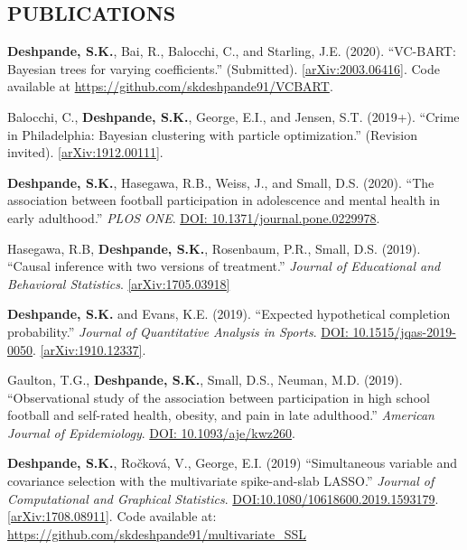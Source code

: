 \documentclass[margin]{res}
\begin{document}
\begin{resume}
\section{PUBLICATIONS}

\textbf{Deshpande, S.K.}, Bai, R., Balocchi, C., and Starling, J.E. (2020). ``VC-BART: Bayesian trees for varying coefficients.'' (Submitted). \href{https://arxiv.org/abs/2003.06416}{[arXiv:2003.06416]}. Code available at \url{https://github.com/skdeshpande91/VCBART}.

Balocchi, C., \textbf{Deshpande, S.K.}, George, E.I., and Jensen, S.T. (2019+). ``Crime in Philadelphia: Bayesian clustering with particle optimization.'' (Revision invited). \href{https://arxiv.org/abs/1912.00111}{[arXiv:1912.00111]}.

\textbf{Deshpande, S.K.}, Hasegawa, R.B., Weiss, J., and Small, D.S. (2020). ``The association between football participation in adolescence and mental health in early adulthood.'' \textit{PLOS ONE}. \href{https://doi.org/10.1371/journal.pone.0229978}{DOI: 10.1371/journal.pone.0229978}.

Hasegawa, R.B, \textbf{Deshpande, S.K.}, Rosenbaum, P.R., Small, D.S. (2019). ``Causal inference with two versions of treatment.'' \textit{Journal of Educational and Behavioral Statistics}. \href{https://arxiv.org/abs/1705.03918}{[arXiv:1705.03918]}

\textbf{Deshpande, S.K.} and Evans, K.E. (2019). ``Expected hypothetical completion probability.'' \textit{Journal of Quantitative Analysis in Sports}. \href{https://doi.org/10.1515/jqas-2019-0050}{DOI: 10.1515/jqas-2019-0050}. \href{https://arxiv.org/abs/1910.12337}{[arXiv:1910.12337]}.

Gaulton, T.G., \textbf{Deshpande, S.K.}, Small, D.S., Neuman, M.D. (2019). ``Observational study of the association between participation in high school football and self-rated health, obesity, and pain in late adulthood.'' \textit{American Journal of Epidemiology}. \href{https://doi.org/10.1093/aje/kwz260}{DOI: 10.1093/aje/kwz260}.

\textbf{Deshpande, S.K.}, Ro\v{c}kov\'{a}, V.,  George, E.I. (2019) ``Simultaneous variable and covariance selection with the multivariate spike-and-slab LASSO.'' \textit{Journal of Computational and Graphical Statistics}. \href{https://doi.org/10.1080/10618600.2019.1593179}{DOI:10.1080/10618600.2019.1593179}. \href{https://arxiv.org/abs/1708.08911}{[arXiv:1708.08911]}. Code available at: \url{https://github.com/skdeshpande91/multivariate_SSL}


\end{resume}
\end{document}
